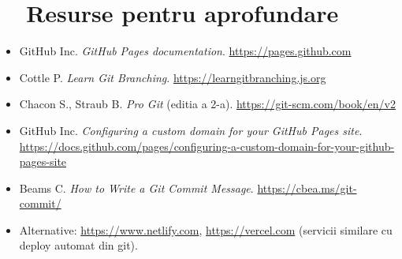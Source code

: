 \section*{\faGraduationCap\ \ Resurse pentru aprofundare}

\begin{itemize}[itemsep=2pt]
  \item GitHub Inc. \emph{GitHub Pages documentation}. \url{https://pages.github.com}
  \item Cottle P. \emph{Learn Git Branching}. \url{https://learngitbranching.js.org}
  \item Chacon S., Straub B. \emph{Pro Git} (editia a 2-a). \url{https://git-scm.com/book/en/v2}
  \item GitHub Inc. \emph{Configuring a custom domain for your GitHub Pages site}. \\\url{https://docs.github.com/pages/configuring-a-custom-domain-for-your-github-pages-site}
  \item Beams C. \emph{How to Write a Git Commit Message}. \url{https://cbea.ms/git-commit/}
  \item Alternative: \url{https://www.netlify.com}, \url{https://vercel.com} (servicii similare cu deploy automat din git).
\end{itemize}

\bigskip

